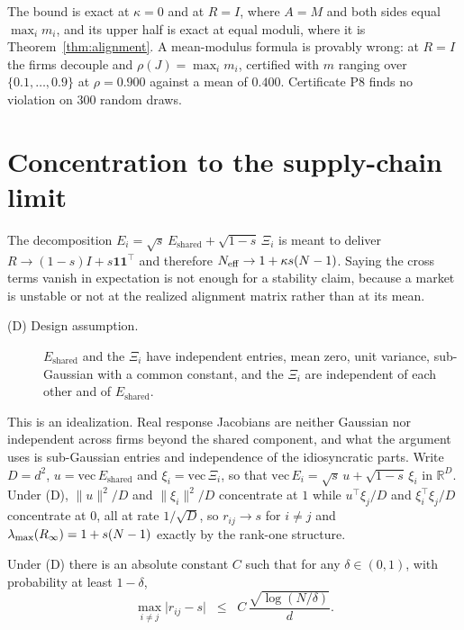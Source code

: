 The bound is exact at $\kappa=0$ and at $R=I$, where $A=M$ and both sides equal $\max_i m_i$, and its upper half is exact at equal moduli, where it is Theorem~\ref{thm:alignment}. A mean-modulus formula is provably wrong: at $R=I$ the firms decouple and $\rho(J) = \max_i m_i$, certified with $m$ ranging over $\{0.1,\ldots,0.9\}$ at $\rho = 0.900$ against a mean of $0.400$. Certificate P8 finds no violation on 300 random draws.

\section{Concentration to the supply-chain limit}
\label{app:concentration}

The decomposition $E_i = \sqrt{s}\,E_{\text{shared}} + \sqrt{1-s}\,\Xi_i$ is meant to deliver $R \to (1-s)I + s\mathbf{1}\mathbf{1}^{\top}$ and therefore $N_{\mathrm{eff}} \to 1 + \kappa s(N-1)$. Saying the cross terms vanish in expectation is not enough for a stability claim, because a market is unstable or not at the realized alignment matrix rather than at its mean.

\begin{description}
\item[(D) Design assumption.] $E_{\text{shared}}$ and the $\Xi_i$ have independent entries, mean zero, unit variance, sub-Gaussian with a common constant, and the $\Xi_i$ are independent of each other and of $E_{\text{shared}}$.
\end{description}

This is an idealization. Real response Jacobians are neither Gaussian nor independent across firms beyond the shared component, and what the argument uses is sub-Gaussian entries and independence of the idiosyncratic parts. Write $D = d^2$, $u = \mathrm{vec}\,E_{\text{shared}}$ and $\xi_i = \mathrm{vec}\,\Xi_i$, so that $\mathrm{vec}\,E_i = \sqrt{s}\,u + \sqrt{1-s}\,\xi_i$ in $\mathbb{R}^D$. Under (D), $\|u\|^2/D$ and $\|\xi_i\|^2/D$ concentrate at $1$ while $u^{\top}\xi_j/D$ and $\xi_i^{\top}\xi_j/D$ concentrate at $0$, all at rate $1/\sqrt{D}$, so $r_{ij}\to s$ for $i\neq j$ and $\lambda_{\max}(R_\infty) = 1 + s(N-1)$ exactly by the rank-one structure.

\begin{alemma}
\label{alem:entrywise}
Under (D) there is an absolute constant $C$ such that for any $\delta \in (0,1)$, with probability at least $1-\delta$,
\[
  \max_{i \neq j} \big| r_{ij} - s \big| \;\;\leq\;\; C\,\frac{\sqrt{\log(N/\delta)}}{d}.
\]
\end{alemma}


